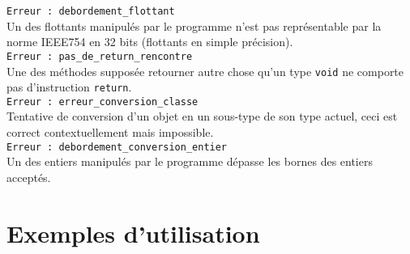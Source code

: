 \documentclass[12pt]{article}
\begin{document}
\lstinline!Erreur : debordement_flottant!\\
Un des flottants manipulés par le programme n'est pas représentable par la norme IEEE754 en 32 bits (flottants en simple précision).\\

\lstinline!Erreur : pas_de_return_rencontre!\\
Une des méthodes supposée retourner autre chose qu'un type \verb?void? ne comporte pas d'instruction \verb?return?.\\

\lstinline!Erreur : erreur_conversion_classe!\\
Tentative de conversion d'un objet en un sous-type de son type actuel, ceci est correct contextuellement mais impossible.\\

\lstinline!Erreur : debordement_conversion_entier!\\
Un des entiers manipulés par le programme dépasse les bornes des entiers acceptés.\\

\section{Exemples d'utilisation}
\end{document}
